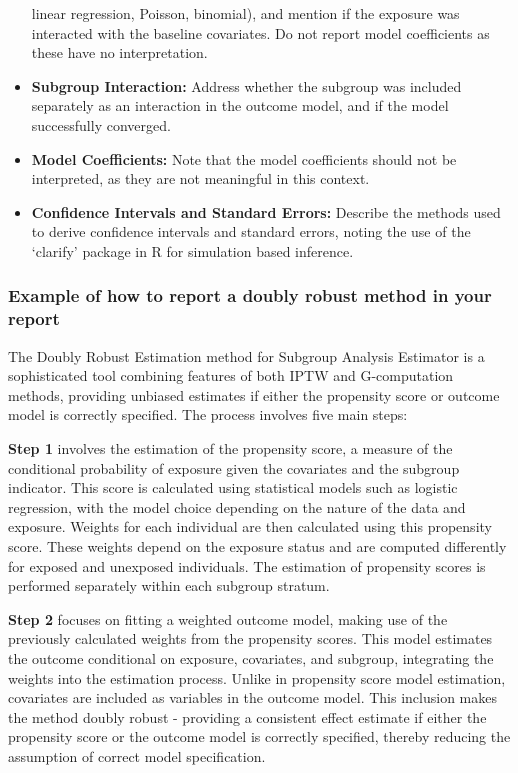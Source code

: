 \documentclass[
  singlecolumn]{article}
\begin{document}
\begin{itemize}
  linear regression, Poisson, binomial), and mention if the exposure was
  interacted with the baseline covariates. Do not report model
  coefficients as these have no interpretation.
\item
  \textbf{Subgroup Interaction:} Address whether the subgroup was
  included separately as an interaction in the outcome model, and if the
  model successfully converged.
\item
  \textbf{Model Coefficients:} Note that the model coefficients should
  not be interpreted, as they are not meaningful in this context.
\item
  \textbf{Confidence Intervals and Standard Errors:} Describe the
  methods used to derive confidence intervals and standard errors,
  noting the use of the `clarify' package in R for simulation based
  inference.
\end{itemize}

\subsubsection{Example of how to report a doubly robust method in your
report}\label{example-of-how-to-report-a-doubly-robust-method-in-your-report}

The Doubly Robust Estimation method for Subgroup Analysis Estimator is a
sophisticated tool combining features of both IPTW and G-computation
methods, providing unbiased estimates if either the propensity score or
outcome model is correctly specified. The process involves five main
steps:

\textbf{Step 1} involves the estimation of the propensity score, a
measure of the conditional probability of exposure given the covariates
and the subgroup indicator. This score is calculated using statistical
models such as logistic regression, with the model choice depending on
the nature of the data and exposure. Weights for each individual are
then calculated using this propensity score. These weights depend on the
exposure status and are computed differently for exposed and unexposed
individuals. The estimation of propensity scores is performed separately
within each subgroup stratum.

\textbf{Step 2} focuses on fitting a weighted outcome model, making use
of the previously calculated weights from the propensity scores. This
model estimates the outcome conditional on exposure, covariates, and
subgroup, integrating the weights into the estimation process. Unlike in
propensity score model estimation, covariates are included as variables
in the outcome model. This inclusion makes the method doubly robust -
providing a consistent effect estimate if either the propensity score or
the outcome model is correctly specified, thereby reducing the
assumption of correct model specification.
\end{document}
